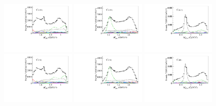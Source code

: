 \begin{figure}[htbp]\centering
    \includegraphics[width=0.32\textwidth]{figure/lineshape/K_1430_0/data_all_m_R_BC.pdf}
    \includegraphics[width=0.32\textwidth]{figure/lineshape/K_1430_0/data_all_m_R_BD.pdf}
    \includegraphics[width=0.32\textwidth]{figure/lineshape/K_1430_0/data_all_m_R_CD.pdf} \\
    \includegraphics[width=0.32\textwidth]{figure/lineshape/K_700_0/data_all_m_R_BC.pdf}
    \includegraphics[width=0.32\textwidth]{figure/lineshape/K_700_0/data_all_m_R_BD.pdf}
    \includegraphics[width=0.32\textwidth]{figure/lineshape/K_700_0/data_all_m_R_CD.pdf} \\

\end{figure}
